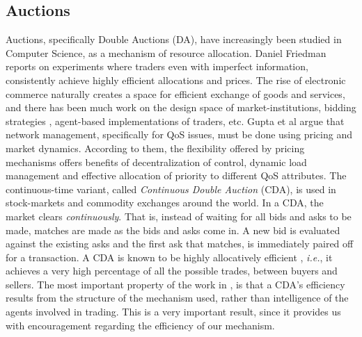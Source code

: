 \documentclass[10pt,journal,compsoc]{IEEEtran}
\begin{document}
\subsection{Auctions}
Auctions, specifically Double Auctions (DA), have increasingly been studied in Computer Science, as a mechanism of resource allocation. Daniel Friedman \cite{Freidman1993Double} reports on experiments where traders even with imperfect information, consistently achieve highly efficient allocations and prices. The rise of electronic commerce naturally creates a space for efficient exchange of goods and services, and there has been much work on the design space of market-institutions\cite{Wurman2001Parametrization, Niu2008Characterizing}, bidding strategies \cite{Cliff1998Simple, Roth1995Learning}, agent-based implementations of traders\cite{Jennings2000Automated, He2003SouthamptonTAC, He2003agent-mediated, Niu2010What}, etc. Gupta et al\cite{Gupta1999economics} argue that network management, specifically for QoS issues, must be done using pricing and market dynamics. According to them, the flexibility offered by pricing mechanisms offers benefits of decentralization of control, dynamic load management and effective allocation of priority to different QoS attributes. The continuous-time variant, called \textit{Continuous Double Auction} (CDA), is used in stock-markets and commodity exchanges around the world\cite{Klemperer1999Auction}. In a CDA, the market clears \textit{continuously}. That is, instead of waiting for all bids and asks to be made, matches are made as the bids and asks come in. A new bid is evaluated against the existing asks and the first ask that matches, is immediately paired off for a transaction. A CDA is known to be highly allocatively efficient \cite{Gode1993Allocative}, \textit{i.e.}, it achieves a very high percentage of all the possible trades, between buyers and sellers. The most important property of the work in \cite{Gode1993Allocative}, is that a CDA's efficiency results from the structure of the mechanism used, rather than intelligence of the agents involved in trading. This is a very important result, since it provides us with encouragement regarding the efficiency of our mechanism.
\end{document}

